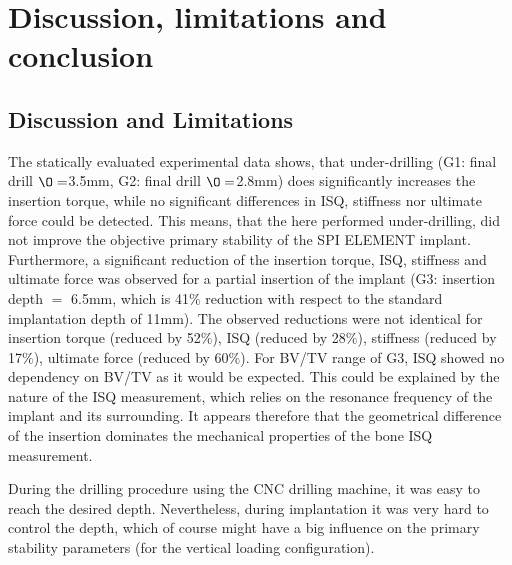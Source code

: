 \documentclass[12pt, a4paper, twoside]{report}
\begin{document}
\chapter{Discussion, limitations and conclusion}
%
%
%
%
\section{Discussion and Limitations}
%
The statically evaluated experimental data shows, that under-drilling (G1: final drill $\O=$3.5mm, G2: final drill $\O=$2.8mm) does significantly increases the insertion torque, while no significant differences in ISQ, stiffness nor ultimate force could be detected. This means, that the here performed under-drilling, did not improve the objective primary stability of the SPI ELEMENT implant. \\
Furthermore, a significant reduction of the insertion torque, ISQ, stiffness and ultimate force was observed for a partial insertion of the implant (G3: insertion depth $=$ 6.5mm, which is 41$\%$ reduction with respect to the standard implantation depth of 11mm). The observed reductions were not identical for insertion torque (reduced by 52$\%$), ISQ (reduced by 28$\%$), stiffness (reduced by 17$\%$), ultimate force (reduced by 60$\%$). For BV/TV range of G3, ISQ showed no dependency on BV/TV as it would be expected. This could be explained by the nature of the ISQ measurement, which relies on the resonance frequency of the implant and its surrounding. It appears therefore that the geometrical difference of the insertion dominates the mechanical properties of the bone ISQ measurement. 

During the drilling procedure using the CNC drilling machine, it was easy to reach the desired depth. Nevertheless, during implantation it was very hard to control the depth, which of course might have a big influence on the primary stability parameters (for the vertical loading configuration). 
\end{document}
